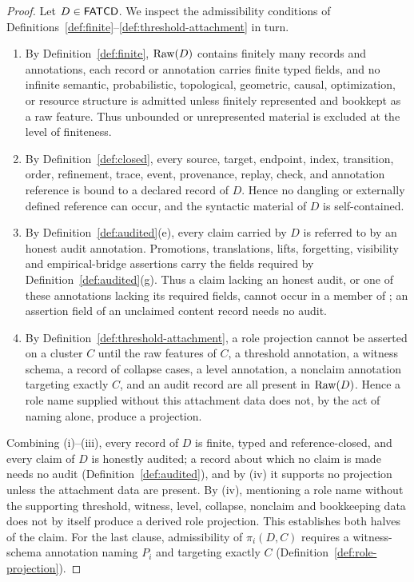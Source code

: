 \begin{proof}
Let \(D \in \mathsf{FATCD}{}\). We inspect the admissibility conditions of
Definitions~\ref{def:finite}--\ref{def:threshold-attachment} in turn.
\begin{enumerate}[label=(\roman*),topsep=2pt,itemsep=1pt]
  \item By Definition~\ref{def:finite}, \(\operatorname{Raw}\!\left(D\right)\) contains finitely many
    records and annotations, each record or annotation carries finite typed
    fields, and no infinite semantic, probabilistic, topological, geometric,
    causal, optimization, or resource structure is admitted unless finitely
    represented and bookkept as a raw feature. Thus unbounded or
    unrepresented material is excluded at the level of finiteness.
  \item By Definition~\ref{def:closed}, every source, target, endpoint,
    index, transition, order, refinement, trace, event, provenance, replay,
    check, and annotation reference is bound to a declared record of \(D\).
    Hence no dangling or externally defined reference can occur, and the
    syntactic material of \(D\) is self-contained.
  \item By Definition~\ref{def:audited}(e), every claim carried by \(D\)
    is referred to by an honest audit annotation. Promotions, translations,
    lifts, forgetting, visibility and empirical-bridge assertions carry the
    fields required by Definition~\ref{def:audited}(g). Thus a claim lacking
    an honest audit, or one of these annotations lacking its required
    fields, cannot occur in a member of \FATCD{}; an assertion field of an
    unclaimed content record needs no audit.
  \item By Definition~\ref{def:threshold-attachment}, a role projection
    cannot be asserted on a cluster \(C\) until the raw features of \(C\), a
    threshold annotation, a witness schema, a record of collapse cases, a
    level annotation, a nonclaim annotation targeting exactly \(C\), and an
    audit record are all present in \(\operatorname{Raw}\!\left(D\right)\).
    Hence a role name supplied without this attachment data does not, by the
    act of naming alone, produce a projection.
\end{enumerate}
Combining (i)--(iii), every record of \(D\) is finite, typed and
reference-closed, and every claim of \(D\) is honestly audited; a record about
which no claim is made needs no audit (Definition~\ref{def:audited}), and by
(iv) it supports no projection unless the attachment data are present. By (iv), mentioning a role name without the supporting
threshold, witness, level, collapse, nonclaim and bookkeeping data does not by itself
produce a derived role projection. This establishes both halves of the
claim. For the last clause, admissibility of \(\pi_i(D,C)\) requires a
witness-schema annotation naming \(P_i\) and targeting exactly \(C\)
(Definition~\ref{def:role-projection}).
\end{proof}

